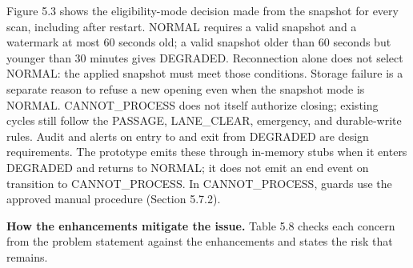 Figure 5.3 shows the eligibility-mode decision made from the snapshot for every scan, including after restart. NORMAL requires a valid snapshot and a watermark at most 60 seconds old; a valid snapshot older than 60 seconds but younger than 30 minutes gives DEGRADED. Reconnection alone does not select NORMAL: the applied snapshot must meet those conditions. Storage failure is a separate reason to refuse a new opening even when the snapshot mode is NORMAL. CANNOT\_PROCESS does not itself authorize closing; existing cycles still follow the PASSAGE, LANE\_CLEAR, emergency, and durable-write rules. Audit and alerts on entry to and exit from DEGRADED are design requirements. The prototype emits these through in-memory stubs when it enters DEGRADED and returns to NORMAL; it does not emit an end event on transition to CANNOT\_PROCESS. In CANNOT\_PROCESS, guards use the approved manual procedure (Section 5.7.2).

\textbf{How the enhancements mitigate the issue.} Table 5.8 checks each concern from the problem statement against the enhancements and states the risk that remains.

